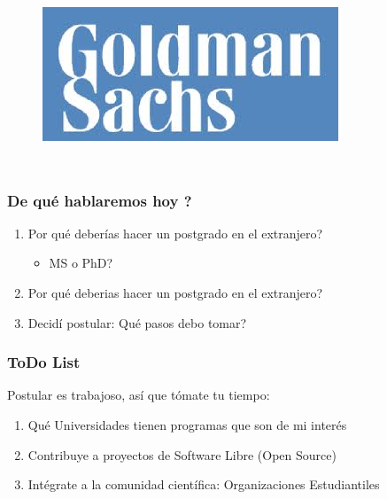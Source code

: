 \documentclass[10pt]{beamer}
\begin{document}
\begin{frame}
\begin{columns}[t]
\begin{figure}[h]
	          \label{fig:MicrosoftLogo}
	          \includegraphics[scale=0.15]{figures/Goldman_Logo.jpg} 	
	          \label{fig:GoldmanLogo}
            \label{fig:Universidades}
	\end{figure} 
\end{columns}

\end{frame}

\begin{frame}
\frametitle{De qué hablaremos hoy ?}
\begin{enumerate}
\item{Por qué deberías hacer un postgrado en el extranjero?
	\begin{itemize}
		\item{MS o PhD?}
	\end{itemize}
}
\item{Por qué {\color{magenta}{NO}} deberias hacer un postgrado en el extranjero?}
\item{ Decidí postular: Qué pasos debo tomar?}
\end{enumerate}

\end{frame}

\begin{frame}
\frametitle{ToDo List}
Postular es {\color{magenta}trabajoso}, así que tómate tu tiempo:
\begin{enumerate}
\item{Qué Universidades tienen programas que son de mi interés}
\item{Contribuye a proyectos de Software Libre (Open Source)}
\item{Intégrate a la comunidad científica: Organizaciones Estudiantiles}
\end{enumerate}

\end{frame}
\end{document}
